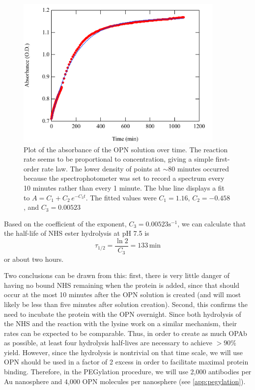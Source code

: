 \begin{figure}[htbp]
\centering
\includegraphics[keepaspectratio,width=4in,height=0.75\textheight]{NHShydro.pdf}
\caption{Plot of the absorbance of the OPN solution over time. The reaction rate seems to be proportional to concentration, giving a simple first-order rate law. The lower density of points at \ensuremath{\sim}80 minutes occurred because the spectrophotometer was set to record a spectrum every 10 minutes rather than every 1 minute. The blue line displays a fit to $A = C_1 + C_2\, e^{-C_3 t}$. The fitted values were $C_1=1.16$, $C_2=-0.458$, and $C_3=0.00523$}
\label{nmabsorption}
\end{figure}



Based on the coefficient of the exponent, $C_3=0.00523\mathrm{s^{-1}}$, we can calculate that the half-life of NHS ester hydrolysis at pH 7.5 is \[\tau_{1/2}=\frac{\ln 2}{C_3} = 133\mathrm{\,min}\]
or about two hours.

Two conclusions can be drawn from this: first, there is very little danger of having no bound NHS remaining when the protein is added, since that should occur at the most 10 minutes after the OPN solution is created (and will most likely be less than five minutes after solution creation). Second, this confirms the need to incubate the protein with the OPN overnight. Since both hydrolysis of the NHS and the reaction with the lysine work on a similar mechanism, their rates can be expected to be comparable. Thus, in order to create as much OPAb as possible, at least four hydrolysis half-lives are necessary to achieve $>90\%$ yield. However, since the hydrolysis is nontrivial on that time scale, we will use OPN should be used in a factor of 2 excess in order to facilitate maximal protein binding. Therefore, in the PEGylation procedure, we will use 2,000 antibodies per Au nanosphere and 4,000 OPN molecules per nanosphere (see \autoref{app:pegylation}).

